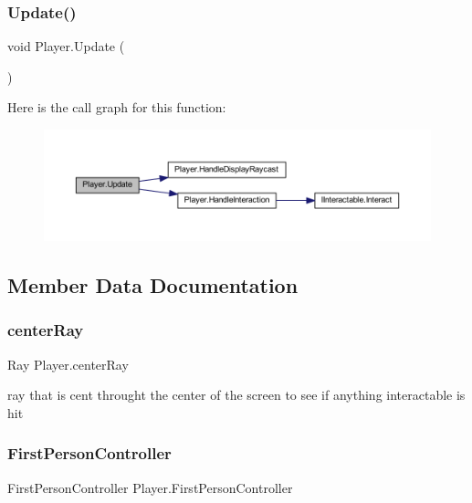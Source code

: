 \subsubsection{\texorpdfstring{Update()}{Update()}}
{\footnotesize\ttfamily void Player.\+Update (\begin{DoxyParamCaption}{ }\end{DoxyParamCaption})\hspace{0.3cm}{\ttfamily [private]}}

Here is the call graph for this function\+:
\nopagebreak
\begin{figure}[H]
\begin{center}
\leavevmode
\includegraphics[width=350pt]{class_player_aace80372e18e32fe177e295fe5d93ba8_cgraph}
\end{center}
\end{figure}


\subsection{Member Data Documentation}
\mbox{\label{class_player_ae2a4edadae1e278ef28c3bb236e7af83}} 
\subsubsection{\texorpdfstring{center\+Ray}{centerRay}}
{\footnotesize\ttfamily Ray Player.\+center\+Ray\hspace{0.3cm}{\ttfamily [private]}}



ray that is cent throught the center of the screen to see if anything interactable is hit 

\mbox{\label{class_player_a2b1dcb2e1f53c780a7501dbc6f89a174}} 
\subsubsection{\texorpdfstring{First\+Person\+Controller}{FirstPersonController}}
{\footnotesize\ttfamily First\+Person\+Controller Player.\+First\+Person\+Controller}



